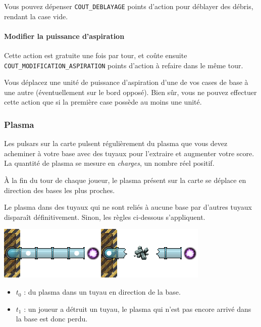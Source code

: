 Vous pouvez dépenser \texttt{COUT\_DEBLAYAGE} points d'action pour
déblayer des débris, rendant la case vide.

\paragraph{Modifier la puissance
d'aspiration}\label{modifier-la-puissance-daspiration}

Cette action est gratuite une fois par tour, et coûte ensuite
\texttt{COUT\_MODIFICATION\_ASPIRATION} points d'action à refaire dans
le même tour.

Vous déplacez une unité de puissance d'aspiration d'une de vos cases de
base à une autre (éventuellement sur le bord opposé). Bien sûr, vous ne
pouvez effectuer cette action que si la première case possède au moins
une unité.

\subsubsection{Plasma}\label{plasma}

Les pulsars sur la carte pulsent régulièrement du plasma que vous devez
acheminer à votre base avec des tuyaux pour l'extraire et augmenter
votre score. La quantité de plasma se mesure en \emph{charges}, un
nombre réel positif.

À la fin du tour de chaque joueur, le plasma présent sur la carte se
déplace en direction des bases les plus proches.

Le plasma dans des tuyaux qui ne sont reliés à aucune base par d'autres
tuyaux disparaît définitivement. Sinon, les règles ci-dessous
s'appliquent.

\includegraphics{asset/debris_t0.png}\hfill\includegraphics{asset/debris_t1.png}

\begin{itemize}
\item $t_0$ : du plasma dans un tuyau en direction de la base.
\item $t_1$ : un joueur a détruit un tuyau, le plasma qui n'est pas encore arrivé
dans la base est donc perdu.
\end{itemize}

